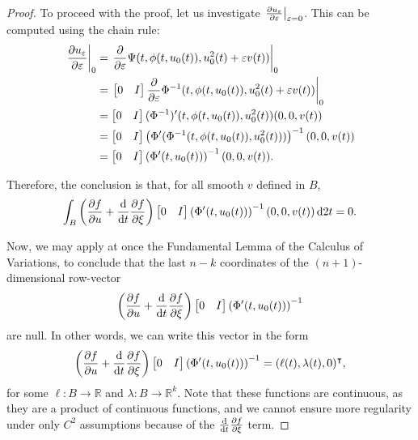 \documentclass{article}
\theoremstyle{plain}
\theoremstyle{plain}
\theoremstyle{nonumberplain}
\newtheorem{proof}{Proof}
\theoremstyle{empty}
\newcommand{\R}{\mathbb{R}}
\newcommand{\tr}{\intercal}
\DeclarePairedDelimiter\eval{.}{\rvert}
\begin{document}
\begin{proof}
To proceed with the proof, let us investigate $\eval*{\diffp {u_\varepsilon} \varepsilon}_{\varepsilon = 0}$. This can be computed using the chain rule:
\begin{align*}
\eval*{\diffp {u_\varepsilon} \varepsilon}_0 &= \eval*{\diffp*{\Psi(t, \phi(t,u_0(t)), u_0^2(t) + \varepsilon v(t))} \varepsilon}_0\\
&= \eval*{\begin{bmatrix} 0 & I \end{bmatrix} \diffp*{\Phi^{-1}(t, \phi(t,u_0(t)), u_0^2(t) + \varepsilon v(t))} \varepsilon}_0\\
&= \begin{bmatrix} 0 & I \end{bmatrix} (\Phi^{-1})'(t, \phi(t,u_0(t)), u_0^2(t)) (0, 0, v(t))\\
&= \begin{bmatrix} 0 & I \end{bmatrix} \left(\Phi'(\Phi^{-1}(t, \phi(t,u_0(t)), u_0^2(t)))\right)^{-1} (0,0,v(t))\\
&= \begin{bmatrix} 0 & I \end{bmatrix} \left( \Phi'(t, u_0(t)) \right)^{-1} (0,0,v(t)).
\end{align*}

Therefore, the conclusion is that, for all smooth $v$ defined in $B$,
\[
\int_B \left( \diffp f u + \diff*{\diffp f {\xi}}t \right) \begin{bmatrix} 0 & I \end{bmatrix} \left( \Phi'(t, u_0(t)) \right)^{-1} (0,0,v(t))\dl2 t = 0.
\]

Now, we may apply at once the Fundamental Lemma of the Calculus of Variations, to conclude that the last $n-k$ coordinates of the $(n+1)$-dimensional row-vector
\[\left( \diffp f u + \diff*{\diffp f {\xi}}t \right) \begin{bmatrix} 0 & I \end{bmatrix} \left( \Phi'(t, u_0(t)) \right)^{-1}\]
are null.  In other words, we can write this vector in the form
\[\left( \diffp f u + \diff*{\diffp f {\xi}}t \right) \begin{bmatrix} 0 & I \end{bmatrix} \left( \Phi'(t, u_0(t)) \right)^{-1} = (\ell(t),\lambda(t),0)^\tr,\]
for some $\ell : B \to \R$ and $\lambda : B \to \R^k$. Note that these functions are continuous, as they are a product of continuous functions, and we cannot ensure more regularity under only $C^2$ assumptions because of the $\diff*{\diffp f \xi}t$ term.


\end{proof}
\end{document}

